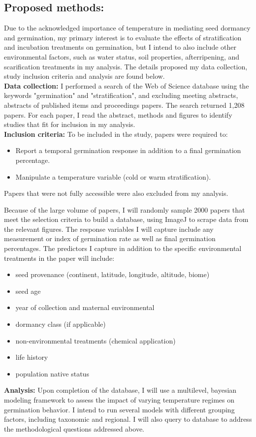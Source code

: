 \documentclass{article}\usepackage[]{graphicx}\usepackage[]{color}
\begin{document}
\subsection*{Proposed methods:}
\indent\indent Due to the acknowledged importance of temperature in mediating seed dormancy and germination, my primary interest is to evaluate the effects of stratification and incubation treatments on germination, but I intend to also include other environmental factors, such as water status, soil properties, afterripening, and scarification treatments in my analysis. The details proposed my data collection, study inclusion criteria and analysis are found below.\\
\indent\textbf{Data collection:} I performed a search of the Web of Science database using the keywords "germination" and "stratification", and excluding meeting abstracts, abstracts of published items and proceedings papers. The search returned 1,208 papers. For each paper, I read the abstract, methods and figures to identify studies that fit for inclusion in my analysis.\\
\indent\textbf{Inclusion criteria:} To be included in the study, papers were required to:
\begin{itemize}
\item Report a temporal germination response in addition to a final germination percentage.
\item Manipulate a temperature variable (cold or warm stratification).
\end{itemize}
Papers that were not fully accessible were also excluded from my analysis. 
\par Because of the large volume of papers, I will randomly sample 2000 papers that meet the selection criteria to build a database, using ImageJ to scrape data from the relevant figures. The response variables I will capture include any measurement or index of germination rate as well as final germination percentages. The predictors I capture in addition to the specific environmental treatments in the paper will include:
\begin{itemize}
\item seed provenance (continent, latitude, longitude, altitude, biome)
\item seed age
\item year of collection and maternal environmental
\item dormancy class (if applicable)
\item non-environmental treatments (chemical application)
\item life history
\item population native status
\end{itemize}
\indent\indent\textbf{Analysis:} Upon completion of the database, I will use a multilevel, bayesian modeling framework to assess the impact of varying temperature regimes on germination behavior. I intend to run several models with different grouping factors, including taxonomic and regional. I will also query to database to address the methodological questions addressed above.
\end{document}
